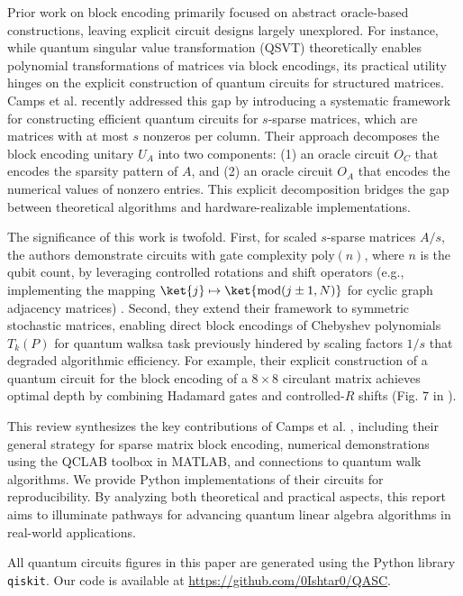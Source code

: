 \documentclass{article}
\begin{document}
Prior work on block encoding primarily focused on abstract oracle-based constructions, leaving explicit circuit designs largely unexplored. For instance, while quantum singular value transformation (QSVT) \cite{Gilyen2019} theoretically enables polynomial transformations of matrices via block encodings, its practical utility hinges on the explicit construction of quantum circuits for structured matrices. Camps et al. \cite{EQC} recently addressed this gap by introducing a systematic framework for constructing efficient quantum circuits for $s$-sparse matrices, which are matrices with at most $s$ nonzeros per column. Their approach decomposes the block encoding unitary $U_A$ into two components: (1) an oracle circuit $O_C$ that encodes the sparsity pattern of $A$, and (2) an oracle circuit $O_A$ that encodes the numerical values of nonzero entries. This explicit decomposition bridges the gap between theoretical algorithms and hardware-realizable implementations.

The significance of this work is twofold. First, for scaled $s$-sparse matrices $A/s$, the authors demonstrate circuits with gate complexity $\text{poly}(n)$, where $n$ is the qubit count, by leveraging controlled rotations and shift operators (e.g., implementing the mapping $\ket{j} \mapsto \ket{\text{mod}(j \pm 1, N)}$ for cyclic graph adjacency matrices) \cite{EQC}. Second, they extend their framework to symmetric stochastic matrices, enabling direct block encodings of Chebyshev polynomials $T_k(P)$ for quantum walks\textemdash a task previously hindered by scaling factors $1/s$ that degraded algorithmic efficiency. For example, their explicit construction of a quantum circuit for the block encoding of a $8 \times 8$ circulant matrix achieves optimal depth by combining Hadamard gates and controlled-$R$ shifts (Fig. 7 in \cite{EQC}).

This review synthesizes the key contributions of Camps et al. \cite{EQC}, including their general strategy for sparse matrix block encoding, numerical demonstrations using the QCLAB toolbox in MATLAB, and connections to quantum walk algorithms. We provide Python implementations of their circuits for reproducibility. By analyzing both theoretical and practical aspects, this report aims to illuminate pathways for advancing quantum linear algebra algorithms in real-world applications.

All quantum circuits figures in this paper are generated using the Python library \texttt{qiskit}. Our code is available at \url{https://github.com/0Ishtar0/QASC}.
\end{document}

